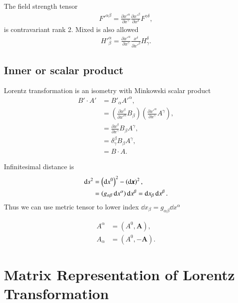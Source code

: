 The field strength tensor 
\begin{align*}
  F'^{\alpha\beta} = \frac{\partial x'^\alpha}{\partial x^\gamma} \frac{\partial x'^\beta}{\partial x^\delta} F^{\gamma\delta},
\end{align*}
is contravariant rank 2.
Mixed is also allowed 
\begin{align*}
  H'^\alpha_\beta = \frac{\partial x'^\alpha}{\partial x^\gamma} \frac{x^\delta}{\partial x'^\beta} H^\delta_\gamma.
\end{align*}

\subsection{Inner or scalar product}
Lorentz transformation is an isometry with Minkowski scalar product
\begin{align*}
   B' \cdot A' &= B'_\alpha A'^\alpha, \\
               &= \left( \frac{\partial x^\beta}{\partial x'^\alpha} B_\beta \right) \left( \frac{\partial x'^\alpha}{\partial x^\gamma} A^\gamma \right), \\
               &= \frac{\partial x^\beta}{\partial x^\gamma} B_\beta A^\gamma, \\
               &= \delta^\beta_\gamma B_\beta A^\gamma, \\
               &= B \cdot A.
\end{align*}

Infinitesimal distance is
\begin{align}
   \dd{s}^2 &= \left( \dd{x^0} \right)^2 - \left( \dd{\pmb{x}} \right)^2 \notag, \\
            &= (g_{\alpha\beta} \dd{x^\alpha}) \dd{x^\beta} = \dd{x_\beta} \dd{x^{\beta}}.
\end{align}
Thus we can use metric tensor to lower index $\dd{x_\beta} = g_{\alpha\beta} \dd{x^{\alpha}}$

\begin{align*}
   A^\alpha &= \left(A^0, \pmb{A} \right), \\
   A_\alpha &= \left(A^0, -\pmb{A} \right).
\end{align*}

\section{Matrix Representation of Lorentz Transformation}

